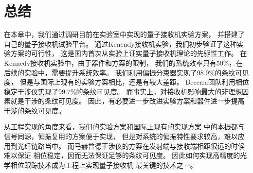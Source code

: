 \section{总结}
在本章中，我们通过调研目前在实验室中实现的量子接收机实验方案，
并搭建了自己的量子接收机试验平台。
通过Kenendy接收机实验，我们初步验证了这种实验方案的可行性，
这是国内首次从实验上证实量子接收机理论的先驱性工作。
在Kennedy接收机实验中，由于器件和方案的限制，
我们的系统效率只有50\%，在后续的实验中，需要提升系统效率。
我们利用偏振分束器实现了98.9\%的条纹可见度，
但是与国际上现有的实验方案相比，还是有较大差距。
Becerra团队利用相位稳定干涉仪实现了99.7\%的条纹可见度\cite{becerra2013experimental}。
而事实上，对接收机影响最大的非理想因素就是干涉的条纹可见度\cite{li2013suppressing}。
因此，有必要进一步改进实验方案和器件进一步提高干涉的条纹可见度。

从工程实现的角度来看，我们的实验方案和国际上现有的实现方案\cite{wittmann2008demonstration,wittmann2010demonstration,tsujino2010sub,
tsujino2011quantum,becerra2011m,chen2012optical,muller2012quadrature,becerra2013experimental,
becerra2015photon}
中的本振都与信号同源，偏振复用的方案便于实现，
但是对系统的偏振特性要求较高，难以应用到光纤链路当中。
而马赫曾德干涉仪的方案在发射端与接收端相距很远的时候难以保证
相位稳定，因而无法保证足够的条纹可见度。
因此如何实现高精度的光学相位跟踪技术成为工程上实现量子接收机
最关键的技术之一。



